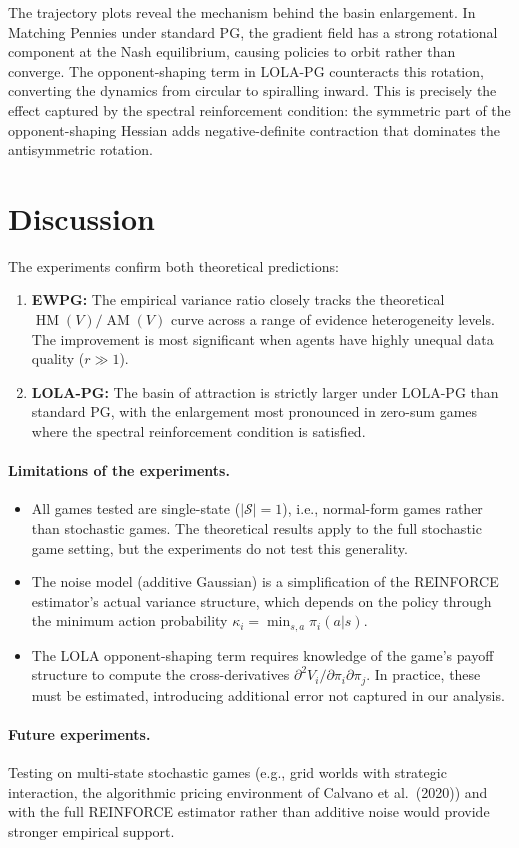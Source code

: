 The trajectory plots reveal the mechanism behind the basin enlargement. In Matching Pennies under standard PG, the gradient field has a strong rotational component at the Nash equilibrium, causing policies to orbit rather than converge. The opponent-shaping term in LOLA-PG counteracts this rotation, converting the dynamics from circular to spiralling inward. This is precisely the effect captured by the spectral reinforcement condition: the symmetric part of the opponent-shaping Hessian adds negative-definite contraction that dominates the antisymmetric rotation.


\section{Discussion}
\label{sec:sim-discussion}

The experiments confirm both theoretical predictions:

\begin{enumerate}
    \item \textbf{EWPG:} The empirical variance ratio closely tracks the theoretical $\operatorname{HM}(V)/\operatorname{AM}(V)$ curve across a range of evidence heterogeneity levels. The improvement is most significant when agents have highly unequal data quality ($r \gg 1$).

    \item \textbf{LOLA-PG:} The basin of attraction is strictly larger under LOLA-PG than standard PG, with the enlargement most pronounced in zero-sum games where the spectral reinforcement condition is satisfied.
\end{enumerate}

\paragraph{Limitations of the experiments.}
\begin{itemize}
    \item All games tested are single-state ($|\mathcal{S}| = 1$), i.e., normal-form games rather than stochastic games. The theoretical results apply to the full stochastic game setting, but the experiments do not test this generality.
    \item The noise model (additive Gaussian) is a simplification of the REINFORCE estimator's actual variance structure, which depends on the policy through the minimum action probability $\kappa_i = \min_{s,a} \pi_i(a|s)$.
    \item The LOLA opponent-shaping term requires knowledge of the game's payoff structure to compute the cross-derivatives $\partial^2 V_i / \partial \pi_i \partial \pi_j$. In practice, these must be estimated, introducing additional error not captured in our analysis.
\end{itemize}

\paragraph{Future experiments.} Testing on multi-state stochastic games (e.g., grid worlds with strategic interaction, the algorithmic pricing environment of Calvano et al.~(2020)) and with the full REINFORCE estimator rather than additive noise would provide stronger empirical support.
